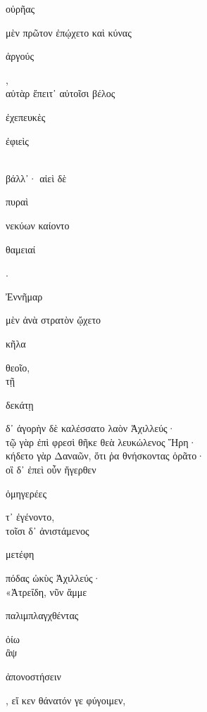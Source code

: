 \documentclass{ransom}
\begin{document}
\renewcommand{\rightheaderwhat}{\rightheaderwhatglosses}%
\begin{foreignpage}
\begin{graytext}
\begin{whitetext}οὐρῆας\end{whitetext} μὲν πρῶτον ἐπῴχετο καὶ κύνας \begin{whitetext}ἀργούς\end{whitetext},\hfill{}\\
αὐτὰρ ἔπειτ᾽ αὐτοῖσι βέλος \begin{whitetext}ἐχεπευκὲς\end{whitetext} \begin{whitetext}ἐφιεὶς\end{whitetext}\\
βάλλ᾽· αἰεὶ δὲ \begin{whitetext}πυραὶ\end{whitetext} νεκύων καίοντο \begin{whitetext}θαμειαί\end{whitetext}.\\
\begin{whitetext}Ἐννῆμαρ\end{whitetext} μὲν ἀνὰ στρατὸν ᾤχετο \begin{whitetext}κῆλα\end{whitetext} θεοῖο,\\
τῇ \begin{whitetext}δεκάτῃ\end{whitetext} δ᾽ ἀγορὴν δὲ καλέσσατο λαὸν Ἀχιλλεύς·\\
τῷ γὰρ ἐπὶ φρεσὶ θῆκε θεὰ λευκώλενος Ἥρη·\hfill{}\\
κήδετο γὰρ Δαναῶν, ὅτι ῥα θνήσκοντας ὁρᾶτο·\\
οἳ δ᾽ ἐπεὶ οὖν ἤγερθεν \begin{whitetext}ὁμηγερέες\end{whitetext} τ᾽ ἐγένοντο,\\
τοῖσι δ᾽ ἀνιστάμενος \begin{whitetext}μετέφη\end{whitetext} πόδας ὠκὺς Ἀχιλλεύς·\\
«Ἀτρεΐδη, νῦν ἄμμε \begin{whitetext}παλιμπλαγχθέντας\end{whitetext} ὀίω\\
ἂψ \begin{whitetext}ἀπονοστήσειν\end{whitetext}, εἴ κεν θάνατόν γε φύγοιμεν,\hfill{}\\

\end{graytext}
\end{foreignpage}
\end{document}
